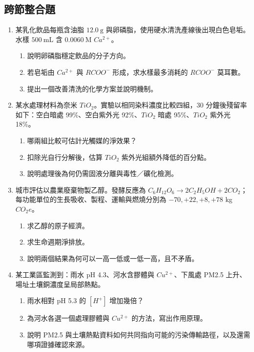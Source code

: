 \documentclass[11pt,a4paper]{article}
\providecommand{\tightlist}{%
  \setlength{\itemsep}{0pt}\setlength{\parskip}{0pt}}
\begin{document}
\subsection{跨節整合題}\label{ux8de8ux7bc0ux6574ux5408ux984c}

\begin{enumerate}
\def\labelenumi{\arabic{enumi}.}
\setcounter{enumi}{12}
\tightlist
\item
  某乳化飲品每瓶含油脂 \(12.0\ \mathrm g\) 與卵磷脂，使用硬水清洗產線後出現白色皂垢。水樣 \(500\ \mathrm{mL}\) 含 \(0.0060\ \mathrm M\) \(Ca^{2+}\)。

  \begin{enumerate}
  \def\labelenumii{\arabic{enumii}.}
  \tightlist
  \item
    說明卵磷脂穩定飲品的分子方向。
  \item
    若皂垢由 \(Ca^{2+}\) 與 \(RCOO^-\) 形成，求水樣最多消耗的 \(RCOO^-\) 莫耳數。
  \item
    提出一個改善清洗的化學方案並說明機制。
  \end{enumerate}
\item
  某水處理材料為奈米 \(TiO_2\)。實驗以相同染料濃度比較四組，30 分鐘後殘留率如下：空白暗處 99\%、空白紫外光 92\%、\(TiO_2\) 暗處 95\%、\(TiO_2\) 紫外光 18\%。

  \begin{enumerate}
  \def\labelenumii{\arabic{enumii}.}
  \tightlist
  \item
    哪兩組比較可估計光觸媒的淨效果？
  \item
    扣除光自行分解後，估算 \(TiO_2\) 紫外光組額外降低的百分點。
  \item
    說明處理後為何仍需固液分離與毒性／礦化檢測。
  \end{enumerate}
\item
  城市評估以農業廢棄物製乙醇。發酵反應為 \(C_6H_{12}O_6\rightarrow2C_2H_5OH+2CO_2\)；每功能單位的生長吸收、製程、運輸與燃燒分別為 \(-70,+22,+8,+78\) kg \(CO_2e\)。

  \begin{enumerate}
  \def\labelenumii{\arabic{enumii}.}
  \tightlist
  \item
    求乙醇的原子經濟。
  \item
    求生命週期淨排放。
  \item
    說明兩個結果為何可以一高一低或一低一高，且不矛盾。
  \end{enumerate}
\item
  某工業區監測到：雨水 pH 4.3、河水含膠體與 \(Cu^{2+}\)、下風處 PM2.5 上升、場址土壤銅濃度呈局部熱點。

  \begin{enumerate}
  \def\labelenumii{\arabic{enumii}.}
  \tightlist
  \item
    雨水相對 pH 5.3 的 \([H^+]\) 增加幾倍？
  \item
    為河水各選一個處理膠體與 \(Cu^{2+}\) 的方法，寫出作用原理。
  \item
    說明 PM2.5 與土壤熱點資料如何共同指向可能的污染傳輸路徑，以及還需哪項證據確認來源。
  \end{enumerate}
\end{enumerate}
\end{document}
